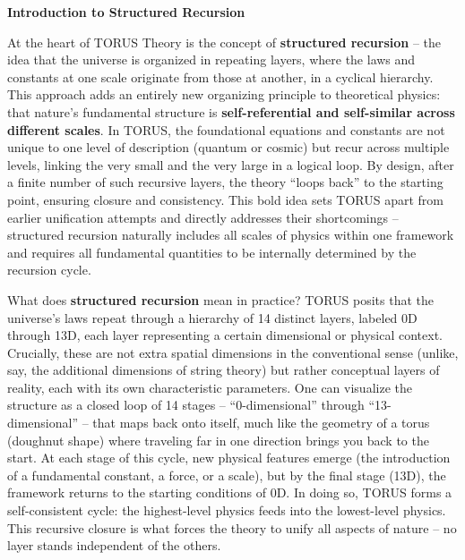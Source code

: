 \documentclass[
]{article}
\begin{document}
\textbf{Introduction to Structured Recursion}

At the heart of TORUS Theory is the concept of \textbf{structured
recursion} -- the idea that the universe is organized in repeating
layers, where the laws and constants at one scale originate from those
at another, in a cyclical hierarchy. This approach adds an entirely new
organizing principle to theoretical physics: that nature's fundamental
structure is \textbf{self-referential and self-similar across different
scales}. In TORUS, the foundational equations and constants are not
unique to one level of description (quantum or cosmic) but recur across
multiple levels, linking the very small and the very large in a logical
loop. By design, after a finite number of such recursive layers, the
theory ``loops back'' to the starting point, ensuring closure and
consistency. This bold idea sets TORUS apart from earlier unification
attempts and directly addresses their shortcomings -- structured
recursion naturally includes all scales of physics within one framework
and requires all fundamental quantities to be internally determined by
the recursion cycle.

What does \textbf{structured recursion} mean in practice? TORUS posits
that the universe's laws repeat through a hierarchy of 14 distinct
layers, labeled 0D through 13D, each layer representing a certain
dimensional or physical context. Crucially, these are not extra spatial
dimensions in the conventional sense (unlike, say, the additional
dimensions of string theory) but rather conceptual layers of reality,
each with its own characteristic parameters. One can visualize the
structure as a closed loop of 14 stages -- ``0-dimensional'' through
``13-dimensional'' -- that maps back onto itself, much like the geometry
of a torus (doughnut shape) where traveling far in one direction brings
you back to the start. At each stage of this cycle, new physical
features emerge (the introduction of a fundamental constant, a force, or
a scale), but by the final stage (13D), the framework returns to the
starting conditions of 0D. In doing so, TORUS forms a self-consistent
cycle: the highest-level physics feeds into the lowest-level physics.
This recursive closure is what forces the theory to unify all aspects of
nature -- no layer stands independent of the others.
\end{document}
